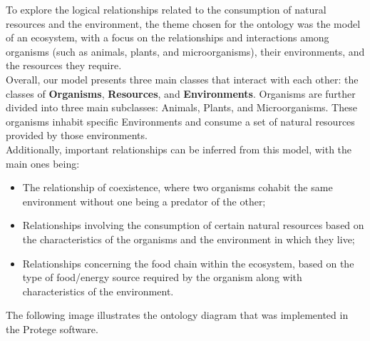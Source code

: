 




To explore the logical relationships related to the consumption of natural resources and the environment, the theme chosen for the ontology was the model of an ecosystem, with a focus on the relationships and interactions among organisms (such as animals, plants, and microorganisms), their environments, and the resources they require.
\\

Overall, our model presents three main classes that interact with each other: the classes of \textbf{Organisms}, \textbf{Resources}, and \textbf{Environments}. Organisms are further divided into three main subclasses: Animals, Plants, and Microorganisms. These organisms inhabit specific Environments and consume a set of natural resources provided by those environments.
\\

Additionally, important relationships can be inferred from this model, with the main ones being:


\begin{itemize}
    \item The relationship of coexistence, where two organisms cohabit the same environment without one being a predator of the other;

    \item Relationships involving the consumption of certain natural resources based on the characteristics of the organisms and the environment in which they live;

    \item Relationships concerning the food chain within the ecosystem, based on the type of food/energy source required by the organism along with characteristics of the environment.
    \\
\end{itemize}


The following image illustrates the ontology diagram that was implemented in the Protege software.

